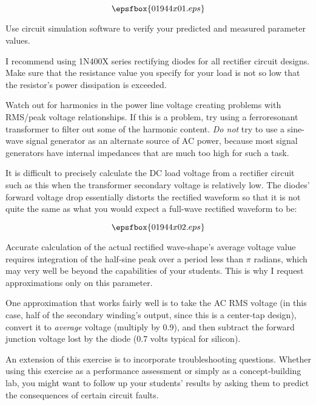 

$$\epsfbox{01944x01.eps}$$

\vfil \eject






Use circuit simulation software to verify your predicted and measured parameter values.







I recommend using 1N400X series rectifying diodes for all rectifier circuit designs.  Make sure that the resistance value you specify for your load is not so low that the resistor's power dissipation is exceeded.  

Watch out for harmonics in the power line voltage creating problems with RMS/peak voltage relationships.  If this is a problem, try using a ferroresonant transformer to filter out some of the harmonic content.  {\it Do not} try to use a sine-wave signal generator as an alternate source of AC power, because most signal generators have internal impedances that are much too high for such a task.

It is difficult to precisely calculate the DC load voltage from a rectifier circuit such as this when the transformer secondary voltage is relatively low.  The diodes' forward voltage drop essentially distorts the rectified waveform so that it is not quite the same as what you would expect a full-wave rectified waveform to be:

$$\epsfbox{01944x02.eps}$$

Accurate calculation of the actual rectified wave-shape's average voltage value requires integration of the half-sine peak over a period less than $\pi$ radians, which may very well be beyond the capabilities of your students.  This is why I request approximations only on this parameter.

One approximation that works fairly well is to take the AC RMS voltage (in this case, half of the secondary winding's output, since this is a center-tap design), convert it to {\it average} voltage (multiply by 0.9), and then subtract the forward junction voltage lost by the diode (0.7 volts typical for silicon).

An extension of this exercise is to incorporate troubleshooting questions.  Whether using this exercise as a performance assessment or simply as a concept-building lab, you might want to follow up your students' results by asking them to predict the consequences of certain circuit faults.




